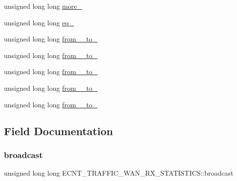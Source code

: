 \begin{DoxyCompactItemize}
\item 
unsigned long long \hyperlink{structECNT__TRAFFIC__WAN__RX__STATISTICS_aa6b07ea08c17f7e47411442feea1ce0c}{more\+\_}
\item 
unsigned long long \hyperlink{structECNT__TRAFFIC__WAN__RX__STATISTICS_ab4a74bf4a7431d948efbb5debe66db0b}{eq\+\_}
\item 
unsigned long long \hyperlink{structECNT__TRAFFIC__WAN__RX__STATISTICS_a89bc27a262a2ab57f441a9664ce27070}{from\+\_\+\_\+to\+\_}
\item 
unsigned long long \hyperlink{structECNT__TRAFFIC__WAN__RX__STATISTICS_a279298896a3c4b857356562c812e7c07}{from\+\_\+\_\+to\+\_}
\item 
unsigned long long \hyperlink{structECNT__TRAFFIC__WAN__RX__STATISTICS_a86043882f14b658592fb2875aa27f82c}{from\+\_\+\_\+to\+\_}
\item 
unsigned long long \hyperlink{structECNT__TRAFFIC__WAN__RX__STATISTICS_a7baa0dfe7cfbe3abc4a1351ebda76593}{from\+\_\+\_\+to\+\_}
\item 
unsigned long long \hyperlink{structECNT__TRAFFIC__WAN__RX__STATISTICS_aaa659f639246a61091e74b127bb81d3c}{from\+\_\+\_\+to\+\_}
\end{DoxyCompactItemize}


\subsection{Field Documentation}
\mbox{\label{structECNT__TRAFFIC__WAN__RX__STATISTICS_a08f0aaae8ef5545933ef90dedcbe93eb}} 
\subsubsection{\texorpdfstring{broadcast}{broadcast}}
{\footnotesize\ttfamily unsigned long long E\+C\+N\+T\+\_\+\+T\+R\+A\+F\+F\+I\+C\+\_\+\+W\+A\+N\+\_\+\+R\+X\+\_\+\+S\+T\+A\+T\+I\+S\+T\+I\+C\+S\+::broadcast}

